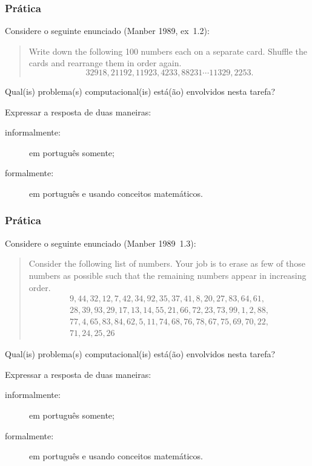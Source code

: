\documentclass{beamer}
\begin{document}
\begin{frame}
  \frametitle{Prática}

  Considere o seguinte enunciado (Manber 1989, ex~1.2):

  \begin{quote}
    Write down the following 100 numbers each on a separate card. Shuffle the cards
    and rearrange them in order again.
    \[
    32918, 21192 , 11923 , 4233 , 88231 \cdots 11329 , 2253.
    \]
  \end{quote}
  
  Qual(is) problema(s) computacional(is) está(ão) envolvidos nesta tarefa? 

  Expressar a resposta de duas maneiras:
  \begin{description}
  \item[informalmente:] em português somente;
  \item[formalmente:] em português e usando conceitos matemáticos.
  \end{description}
  
\end{frame}

\begin{frame}
  \frametitle{Prática}

  Considere o seguinte enunciado (Manber 1989~1.3):

  \begin{quote}
    Consider the following list of numbers. Your job is to erase as few of those numbers as 
    possible such that the remaining numbers appear in increasing order. 
    \[
    \begin{array}{l}
    9, 44, 32, 12, 7, 42, 34, 92, 35, 37, 41, 8, 20, 27, 83, 64, 61, \\
    28, 39, 93, 29, 17, 13, 14, 55, 21, 66, 72, 23, 73, 99, 1, 2, 88, \\
    77, 4, 65, 83, 84, 62, 5, 11, 74, 68, 76, 78, 67, 75, 69, 70, 22, \\
    71, 24, 25, 26
    \end{array}
    \]
  \end{quote}

  
  Qual(is) problema(s) computacional(is) está(ão) envolvidos nesta tarefa? 

  Expressar a resposta de duas maneiras:
  \begin{description}
  \item[informalmente:] em português somente;
  \item[formalmente:] em português e usando conceitos matemáticos.
  \end{description}
  
\end{frame}
\end{document}
